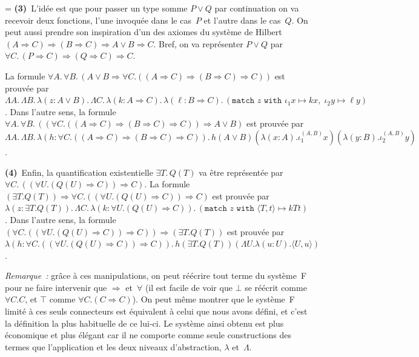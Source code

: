 \documentclass[12pt,a4paper]{article}
\theoremstyle{definition}
\newif\ifcorrige
\newenvironment{corrige}%
{\ifcorrige\relax\else\setbox0=\vbox\bgroup\fi%
\smallbreak\footnotesize\noindent{\underbar{\textit{Corrigé.}}\quad}}
{{\hbox{}\nobreak\hfill\checkmark}%
\ifcorrige\relax\else\egroup\fi\par}
\begin{document}
\begin{corrige}
\textbf{(3)} L'idée est que pour passer un type somme $P\lor Q$ par
continuation on va recevoir deux fonctions, l'une invoquée dans le
cas $P$ et l'autre dans le cas $Q$.  On peut aussi prendre son
inspiration d'un des axiomes du système de Hilbert $(A\Rightarrow C)
\Rightarrow (B\Rightarrow C)\Rightarrow A\lor B\Rightarrow C$.  Bref,
on va représenter $P\lor Q$ par $\forall C.\,(P\Rightarrow C)
\Rightarrow (Q\Rightarrow C)\Rightarrow C$.

La formule $\forall A.\,\forall B.\,(A\lor B \Rightarrow
\forall C.((A\Rightarrow C) \Rightarrow (B\Rightarrow C)\Rightarrow
C))$ est prouvée par $\Lambda A.\, \Lambda B.\, \lambda(z:A\lor B).\,
\Lambda C.\, \lambda(k:A\Rightarrow C).\, \lambda(\ell:B\Rightarrow
C).\, (\texttt{match~}z\texttt{~with~}\iota_1 x \mapsto kx,\; \iota_2
y \mapsto \ell y)$.  Dans l'autre sens, la formule $\forall
A.\,\forall B.\,((\forall C.((A\Rightarrow C)\Rightarrow (B\Rightarrow
C)\Rightarrow C)) \Rightarrow A\lor B)$ est prouvée par $\Lambda A.\,
\Lambda B.\, \lambda(h:\forall C.((A\Rightarrow C)\Rightarrow
(B\Rightarrow C)\Rightarrow C)).\, h(A\lor
B)(\lambda(x:A).\iota_1^{(A,B)} x) (\lambda(y:B).\iota_2^{(A,B)} y)$.

\textbf{(4)} Enfin, la quantification existentielle $\exists T.\,Q(T)$
va être représentée par $\forall C.\,((\forall U. (Q(U)\Rightarrow
C))\Rightarrow C)$.  La formule $(\exists T. Q(T)) \Rightarrow \forall
C.((\forall U. (Q(U)\Rightarrow C))\Rightarrow C)$ est prouvée par
$\lambda(z:\exists T. Q(T)).\, \Lambda C.\, \lambda(k:\forall
U. (Q(U)\Rightarrow C)).\, (\texttt{match~}z\texttt{~with~}\langle
T,t\rangle \mapsto kTt)$.  Dans l'autre sens, la formule $(\forall
C.((\forall U. (Q(U)\Rightarrow C))\Rightarrow C)) \Rightarrow
(\exists T. Q(T))$ est prouvée par $\lambda(h:\forall C.((\forall
U. (Q(U)\Rightarrow C))\Rightarrow C)).\, h(\exists T. Q(T)) (\Lambda
U. \lambda(u:U). \langle U,u\rangle)$.

\emph{Remarque :} grâce à ces manipulations, on peut réécrire tout
terme du système F pour ne faire intervenir que $\Rightarrow$
et $\forall$ (il est facile de voir que $\bot$ se réécrit comme
$\forall C.C$, et $\top$ comme $\forall C.(C\Rightarrow C)$).  On peut
même montrer que le système F limité à ces seuls connecteurs est
équivalent à celui que nous avons défini, et c'est la définition la
plus habituelle de ce lui-ci.  Le système ainsi obtenu est plus
économique et plus élégant car il ne comporte comme seule
constructions des termes que l'application et les deux niveaux
d'abstraction, $\lambda$ et $\Lambda$.


\end{corrige}
\end{document}
